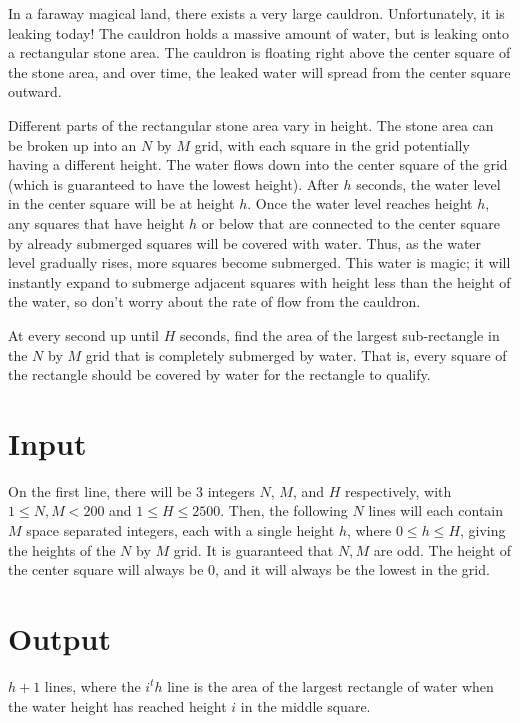 
In a faraway magical land, there exists a very large cauldron. Unfortunately, it is leaking today!
The cauldron holds a massive amount of water, but is leaking onto a rectangular stone area.
The cauldron is floating right above the center square of the stone area, and over time, the leaked water
will spread from the center square outward.

Different parts of the rectangular stone area vary in height. The stone area can be broken up into an $N$
by $M$ grid, with each square in the grid potentially having a different height. The water flows down into
the center square of the grid (which is guaranteed to have the lowest height). After $h$ seconds, the water
level in the center square will be at height $h$. Once the water level reaches height $h$, any squares that
have height $h$ or below that are connected to the center square by already submerged squares will be
covered with water. Thus, as the water level gradually rises, more squares become submerged. This water is
magic; it will instantly expand to submerge adjacent squares with height less than the height of the water,
so don't worry about the rate of flow from the cauldron.

At every second up until $H$ seconds, find the area of the largest sub-rectangle in the $N$ by $M$ grid that 
is completely submerged by water. That is, every square of the rectangle should be covered by water for the
rectangle to qualify.

\section*{Input}
On the first line, there will be 3 integers $N$, $M$, and $H$ respectively, with $1 \le N, M < 200$
and $1 \le H \le 2500$. Then, the following $N$ lines will each contain $M$ space separated integers,
each with a single height $h$, where $0 \le h \le H$, giving the heights of the $N$ by $M$ grid.
It is guaranteed that $N, M$ are odd. The height of the center square will always be $0$, and it will
always be the lowest in the grid.

\section*{Output}
$h + 1$ lines, where the $i^th$ line is the area of the largest rectangle of water when the water height has reached height $i$ in the middle square. 

